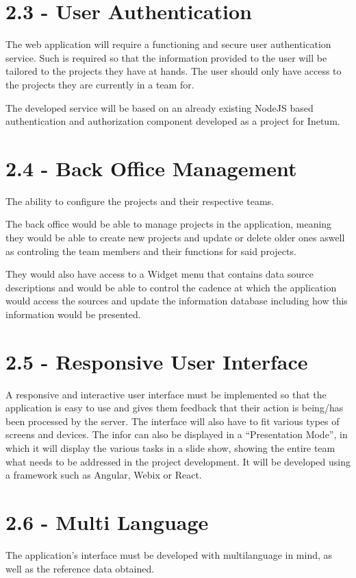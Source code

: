 \documentclass[a4paper,twoside,10pt]{article}
\begin{document}
\section*{2.3 - User Authentication}
The web application will require a functioning and secure user authentication service.
Such is required so that the information provided to the user will be tailored to the projects they have at hands. The user should only have access to the projects they are currently in a team for.

The developed service will be based on an already existing NodeJS based authentication and authorization component developed as a project for Inetum\cite{INETUM}.

\section*{2.4 - Back Office Management}
The ability to configure the projects and their respective teams.

The back office would be able to manage projects in the application, meaning they would be able to create new projects and update or delete older ones aswell as controling the team members and their functions for said projects. 

They would also have access to a Widget menu that contains data source descriptions and would be able to control the cadence at which the application would access the sources and update the information database including how this information would be presented.

\section*{2.5 - Responsive User Interface}
A responsive and interactive user interface must be implemented so that the application is easy to use and gives them feedback that their action is being/has been processed by the server. The interface will also have to fit various types of screens and devices. The infor can also be displayed in a “Presentation Mode”, in which it will display the various tasks in a slide show, showing the entire team what needs to be addressed in the project development.
It will be developed using a framework such as Angular\cite{ANGULAR}, Webix\cite{WEBIX} or React\cite{REACT}.

\section*{2.6 - Multi Language}
The application’s interface must be developed with multilanguage in mind, as well as the reference data obtained.
\end{document}
